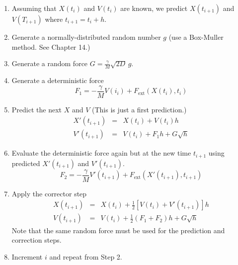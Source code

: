 \bigskip
\begin{myalgobox}
\label{al:heun}

\medskip
\begin{minipage}{5in}
\small
\begin{enumerate}
\item Assuming that $X(t_i)$ and $V(t_i)$ are known, we predict $X(t_{i+1})$ and $V(T_{i+1})$ where $t_{i+1}=t_i+h$.
\item Generate a normally-distributed random number $g$  (use a Box-Muller method. See Chapter 14.)
\item Generate a random force $G = \displaystyle\frac{\gamma}{M} \sqrt{2D}\, g$.
\item Generate a deterministic force
\begin{equation}
F_1 = -\frac{\gamma}{M} V(i_i) + F_\text{ext}(X(t_i),t_i)
\end{equation}
\item Predict the next $X$ and $V$ (This is just a first prediction.)
\begin{eqnarray}
X'(t_{i+1}) &=& X(t_i) + V(t_i) h \\
V'(t_{i+1}) &=& V(t_i) +F_1 h + G \sqrt{h}
\end{eqnarray}
\item Evaluate the deterministic force again but at the new time $t_{i+1}$ using predicted $X'(t_{i+1})$ and $V'(t_{i+1})$.
\begin{equation}
F_2 = -\frac{\gamma}{M} V'(t_{i+1}) + F_\text{ext}(X'(t_{i+1}),t_{i+1})
\end{equation}
\item Apply the corrector step
\begin{eqnarray}
X(t_{i+1}) &=& X(t_i) + \frac{1}{2}[V(t_i)+V'(t_{i+1})] h \\
V(t_{i+1}) &=& V(t_i) +\frac{1}{2}(F_1 + F_2) h + G \sqrt{h}
\end{eqnarray}
Note that the same random force must be used for the prediction and correction steps.
\item Increment $i$ and repeat from Step 2.
\end{enumerate}
\end{minipage}
\end{myalgobox}

